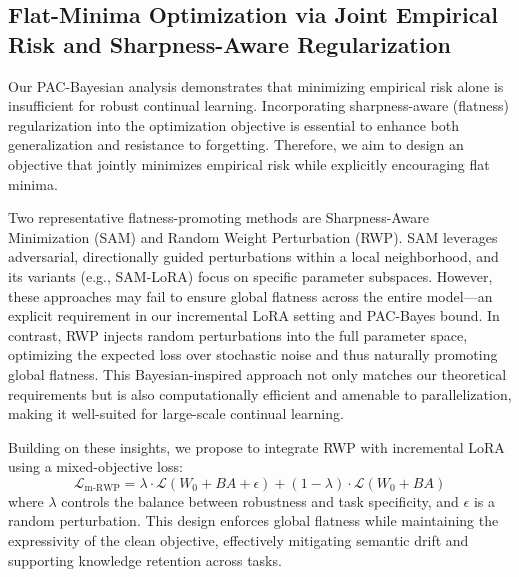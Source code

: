 \documentclass[letterpaper]{article} %
\begin{document}
\subsection{Flat-Minima Optimization via Joint Empirical Risk and Sharpness-Aware Regularization}

Our PAC-Bayesian analysis demonstrates that minimizing empirical risk alone is insufficient for robust continual learning. Incorporating sharpness-aware (flatness) regularization into the optimization objective is essential to enhance both generalization and resistance to forgetting. Therefore, we aim to design an objective that jointly minimizes empirical risk while explicitly encouraging flat minima.


Two representative flatness-promoting methods are Sharpness-Aware Minimization (SAM) and Random Weight Perturbation (RWP). SAM leverages adversarial, directionally guided perturbations within a local neighborhood, and its variants (e.g., SAM-LoRA) focus on specific parameter subspaces. However, these approaches may fail to ensure global flatness across the entire model—an explicit requirement in our incremental LoRA setting and PAC-Bayes bound. In contrast, RWP injects random perturbations into the full parameter space, optimizing the expected loss over stochastic noise and thus naturally promoting global flatness. This Bayesian-inspired approach not only matches our theoretical requirements but is also computationally efficient and amenable to parallelization, making it well-suited for large-scale continual learning.


Building on these insights, we propose to integrate RWP with incremental LoRA using a mixed-objective loss:
\begin{equation}
    \mathcal{L}_{\text{m-RWP}} = \lambda \cdot \mathcal{L}(W_0 + BA + \epsilon) + (1 - \lambda) \cdot \mathcal{L}(W_0 + BA) 
\end{equation}
where $\lambda$ controls the balance between robustness and task specificity, and $\epsilon$ is a random perturbation. This design enforces global flatness while maintaining the expressivity of the clean objective, effectively mitigating semantic drift and supporting knowledge retention across tasks.


\end{document}
